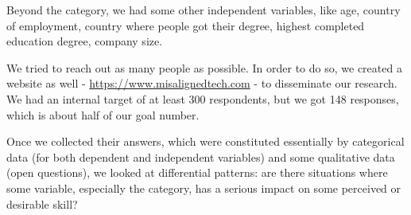 \documentclass{sigchi}
\begin{document}
Beyond the category, we had some other independent variables, like age, country of employment, country where people got their degree, highest completed education degree, company size.

We tried to reach out as many people as possible. In order to do so, we created a website as well - \url{https://www.misalignedtech.com} - to disseminate our research. We had an internal target of at least 300 respondents, but we got 148 responses, which is about half of our goal number. 

Once we collected their answers, which were constituted essentially by categorical data (for both dependent and independent variables) and some qualitative data (open questions), we looked at differential patterns: are there situations where some variable, especially the category, has a serious impact on some perceived or desirable skill?
%
%
%
\end{document}
